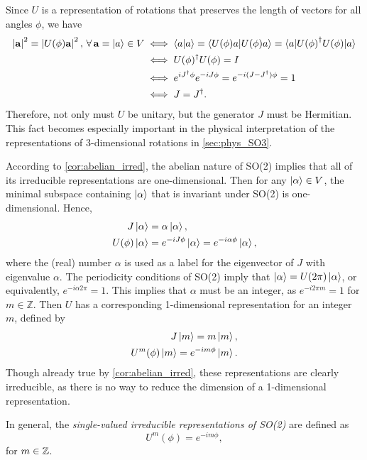 Since $U$ is a representation of rotations that preserves the length of vectors for all angles $\phi$, we have
\begin{align*}
    \left|\mathbf{a}\right|^2 = \left|U(\phi)\mathbf{a}\right|^2, \, \forall\, \mathbf{a}=\ket{a}\in V &\iff \braket{a|a} = \braket{U(\phi)a|U(\phi)a} = \braket{a|{U(\phi)}^\dagger U(\phi)|a} \\
    &\iff U(\phi)^\dagger U(\phi) = I \\
    &\iff e^{iJ^\dagger\phi}e^{-iJ\phi} = e^{-i(J-J^\dagger)\phi} = 1 \\
    &\iff J = J^\dagger.
\end{align*}
Therefore, not only must $U$ be unitary, but the generator $J$ must be Hermitian. This fact becomes especially important in the physical interpretation of the representations of 3-dimensional rotations in \cref{sec:phys_SO3}.

According to \cref{cor:abelian_irred}, the abelian nature of SO(2) implies that all of its irreducible representations are one-dimensional. Then for any $\ket{\alpha}\in V$, the minimal subspace containing $\ket{\alpha}$ that is invariant under SO(2) is one-dimensional. Hence,
\begin{align*}
    J\ket{\alpha} &= \alpha\ket{\alpha}, \\
    U(\phi)\ket{\alpha} &= e^{-iJ\phi}\ket{\alpha} = e^{-i\alpha\phi}\ket{\alpha},
\end{align*}
where the (real) number $\alpha$ is used as a label for the eigenvector of $J$ with eigenvalue $\alpha$. The periodicity conditions of SO(2) imply that $\ket{\alpha} = U(2\pi)\ket{\alpha}$, or equivalently, $e^{-i\alpha2\pi} = 1$. This implies that $\alpha$ must be an integer, as $e^{-i2\pi m} = 1$ for $m\in\mathbb{Z}$. Then $U$ has a corresponding 1-dimensional representation for an integer $m$, defined by
\begin{align*}
    J\ket{m} = m\ket{m}, \\
    U^m(\phi)\ket{m} = e^{-im\phi}\ket{m}.
\end{align*}
Though already true by \cref{cor:abelian_irred}, these representations are clearly irreducible, as there is no way to reduce the dimension of a 1-dimensional representation.

In general, the \textit{single-valued irreducible representations of SO(2)} are defined as
\begin{equation}
    U^m(\phi) = e^{-im\phi},
\end{equation}
for $m\in\mathbb{Z}$.

